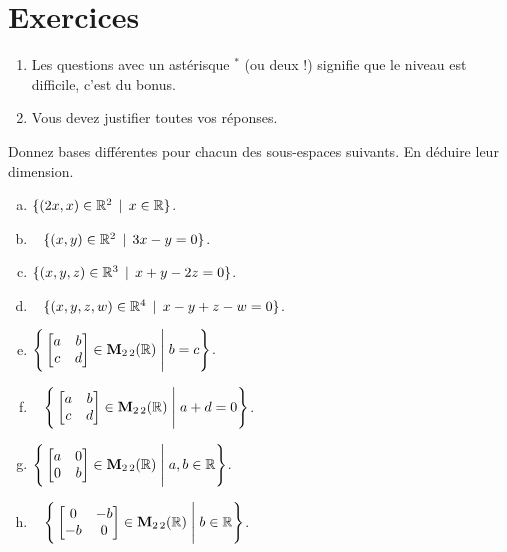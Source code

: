 \section*{Exercices}


 
\begin{enumerate}
\item Les questions avec un astérisque $ ^\ast$ (ou deux !) signifie que le niveau est difficile, c'est du bonus.
\item Vous devez justifier toutes vos réponses.
\end{enumerate}
\smallskip



 \begin{prob} \label{prob09.1} Donnez  bases diff\'erentes pour chacun des sous-espaces suivants. En d\'eduire leur dimension.
\medskip

\begin{enumerate}[(a)]

\item  $\{(2x, x) \in \mathbb{R}^2\, \mid \, x\in \mathbb{R}\}$.\medskip

\item\sov~ $\{(x, y) \in \mathbb{R}^2\, \mid \, 3x - y=0 \}$. \medskip
 


 
\item  $\{(x, y, z) \in \mathbb{R}^3\, \mid \, x+y-2z=0 \}$.   \medskip
 

\item\sov~ $\{(x, y, z, w) \in \mathbb{R}^4\, \mid \, x-y+z-w=0 \}$.   \medskip
 

\item  $\Bigg\{  \bmatrix a&b\\ c&d\endbmatrix \in \M_{2 \,2}(\R) \;\Bigg|\; b=c\Bigg\}$.\medskip \medskip
 

\item\sov~ $\Bigg\{  \bmatrix a&b\\ c&d\endbmatrix \in \M_{2 \,2}(\R) \;\Bigg|\; a+d=0\Bigg\}$. \medskip
 

\item  $\Bigg\{  \bmatrix a&0\\ 0&b\endbmatrix \in \M_{2 \,2}(\R) \;\Bigg|\;  a, b \in \R\Bigg\}$. \medskip
 


\item\sov~ $\Bigg\{  \bmatrix 0&-b\\ -b&0\endbmatrix \in \M_{2 \,2}(\R) \;\Bigg|\; b \in \R\Bigg\}$.      \medskip
 


\end{enumerate}
\end{prob}
